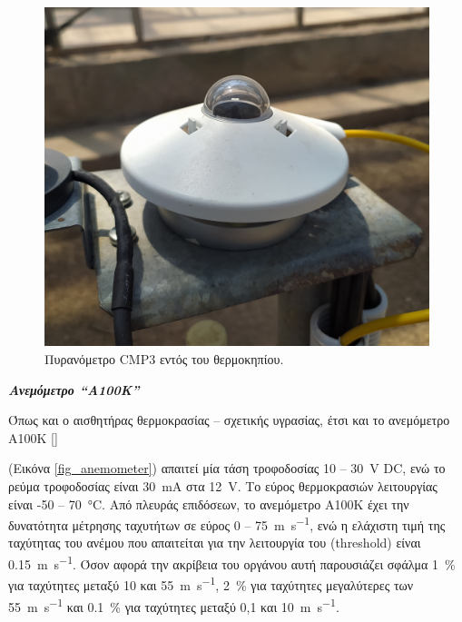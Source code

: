 \documentclass[12pt, a4paper]{report} %
\DeclareRobustCommand{\lcitep}[1]{%
  \english{[\cite{#1}]}%
}
\newcommand{\english}{\foreignlanguage{english}}
\begin{document}
\begin{figure}[ht]%
    \centering
    \includegraphics[scale=0.08]{Figures/pyranometer.jpg}
    \caption{Πυρανόμετρο \english{CMP3} εντός του θερμοκηπίου.}
    \label{fig_pyranometer_in}
\end{figure}

\pagebreak

\noindent \textit{\textbf{Ανεμόμετρο \english{“A100K”}}}

\vspace{0.2cm}

Όπως και ο αισθητήρας θερμοκρασίας – σχετικής υγρασίας, έτσι και το ανεμόμετρο \english{A100K} \lcitep{diataksi_bib4} 
(Εικόνα \ref{fig_anemometer}) απαιτεί μία τάση τροφοδοσίας 10 – \SI{30}{\volt} \english{DC}, ενώ το ρεύμα τροφοδοσίας 
είναι \SI{30}{\milli\ampere} στα \SI{12}{\volt}. Το εύρος θερμοκρασιών λειτουργίας είναι -50 – \SI{70}{\degreeCelsius}. 
Από πλευράς επιδόσεων, το ανεμόμετρο \english{A100K} έχει την δυνατότητα μέτρησης ταχυτήτων σε εύρος 0 – 
\SI{75}{\meter\per\second}, ενώ η ελάχιστη τιμή της ταχύτητας του ανέμου που απαιτείται για την λειτουργία του 
(\english{threshold}) είναι \SI{0.15}{\meter\per\second}. Όσον αφορά την ακρίβεια του οργάνου αυτή παρουσιάζει σφάλμα 
\SI{1}{\percent} για ταχύτητες μεταξύ 10 και \SI{55}{\meter\per\second}, \SI{2}{\percent} για ταχύτητες μεγαλύτερες των 
\SI{55}{\meter\per\second} και \SI{0,1}{\percent} για ταχύτητες μεταξύ 0,1 και \SI{10}{\meter\per\second}.
\end{document}
